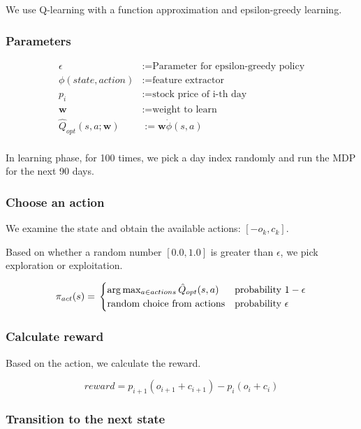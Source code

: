 \documentclass[twocolumn,10pt]{asme2ej}
\newcommand{\vect}[1]{\boldsymbol{#1}}
\begin{document}
We use Q-learning with a function approximation and epsilon-greedy
learning.

\subsubsection*{Parameters}

\begin{align*}
  \epsilon &:= \text{Parameter for epsilon-greedy policy} \\
  \phi(state,action) &:= \text{feature extractor} \\
  p_i &:= \text{stock price of i-th day} \\
  \vect{w} &:= \text{weight to learn} \\
  \hat{Q}_{opt}(s, a; \vect{w}) &:= \vect{w} \dot \phi(s, a) \\
\end{align*}

In learning phase, for 100 times, we pick a day index randomly and run
the MDP for the next 90 days.

\subsubsection*{Choose an action}

We examine the state and obtain the available actions: $[-o_k,c_k]$.

Based on whether a random number $[0.0, 1.0]$ is greater than
$\epsilon$, we pick exploration or exploitation.

\[
  \pi_{act}(s) = \\
  \begin{cases}
    \arg \max_{a \in actions}\hat{Q}_{opt}(s, a) & \text{probability } 1-\epsilon \\
    \text{random choice from actions} & \text{probability } \epsilon \\
  \end{cases}
\]


\subsubsection*{Calculate reward}

Based on the action, we calculate the reward.

\[
  reward = p_{i+1}(o_{i+1} + c_{i+1}) - p_{i}(o_{i} + c_{i})
\]

\subsubsection*{Transition to the next state}
\end{document}
